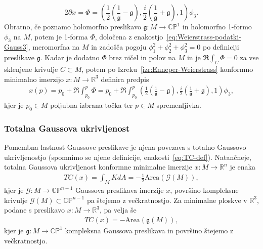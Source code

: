 \documentclass[12pt,a4paper,twoside]{article}
\theoremstyle{definition} %
\theoremstyle{plain} %
\numberwithin{equation}{section}  %
\newcommand{\R}{\mathbb R}
\begin{document}
\begin{equation} \label{eq:Weierstrass-podatki-Gauss3}
2 \partial x = \Phi = \left( \frac{1}{2} \left(\frac{1}{\mathfrak{g}} - \mathfrak{g} \right), \frac{i}{2} \left(\frac{1}{\mathfrak{g}} + \mathfrak{g} \right), 1 \right) \phi_3.
\end{equation}
Obratno, če poznamo holomorfno preslikavo $\mathfrak{g} \colon M \to \mathbb{CP}^{1}$ in holomorfno 1-formo $\phi_3$ na $M$, potem je 1-forma $\Phi$, določena z enakostjo~\eqref{eq:Weierstrass-podatki-Gauss3}, meromorfna na $M$ in zadošča pogoju $\phi_{1}^2 + \phi_{2}^2 + \phi_{3}^2 = 0$ po definiciji preslikave $\mathfrak{g}$.
Kadar je dodatno $\Phi$ brez ničel in polov na $M$ in je $\Re \int_{C} \Phi = 0$ za vse sklenjene krivulje $C \subset M$, potem po Izreku~\ref{izr:Enneper-Weierstrass} konformno minimalno imerzijo $x \colon M \to \mathbb{R}^3$ definira predpis
\begin{gather}
x(p) = p_{0} + \Re \int_{p_0}^{p} \Phi = p_{0} + \Re \int_{p_0}^{p} \left( \frac{1}{2} \left(\frac{1}{\mathfrak{g}} - \mathfrak{g} \right), \frac{i}{2} \left(\frac{1}{\mathfrak{g}} + \mathfrak{g} \right), 1 \right) \phi_3,
\end{gather}
kjer je $p_0 \in M$ poljubna izbrana točka ter $p \in M$ spremenljivka.

\subsubsection{Totalna Gaussova ukrivljenost}
%
Pomembna lastnost Gaussove preslikave je njena povezava s totalno Gaussovo ukrivljenostjo (spomnimo se njene definicije, enakosti~\eqref{eq:TC-def}).
Natančneje, totalna Gaussova ukrivljenost konformne minimalne imerzije $x \colon M \to \R^{n}$ je enaka
\begin{gather}
TC(x) = \int_{M} KdA = -\frac{1}{2} \text{Area}(\mathcal{G}(M)),
\end{gather} 
kjer je $\mathcal{G} \colon M \to \mathbb{CP}^{n-1}$ Gaussova preslikava imerzije $x$, površino kompleksne krivulje $\mathcal{G}(M) \subset \mathbb{CP}^{n-1}$ pa štejemo z večkratnostjo.
Za minimalne ploskve v $\R^{3}$, podane s preslikavo $x \colon M \to \R^3$, pa velja še
\begin{gather}
TC(x) = - \text{Area}(\mathfrak{g}(M)),
\end{gather}
kjer je $\mathfrak{g} \colon M \to \mathbb{CP}^1$ kompleksna Gaussova preslikava in površino štejemo z večkratnostjo.
\end{document}
